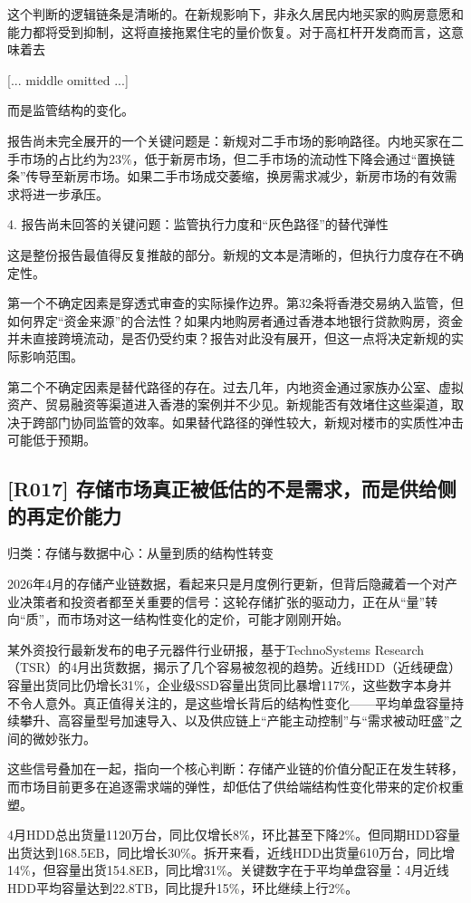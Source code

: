 \documentclass[11pt]{ctexart}
\begin{document}
这个判断的逻辑链条是清晰的。在新规影响下，非永久居民内地买家的购房意愿和能力都将受到抑制，这将直接拖累住宅的量价恢复。对于高杠杆开发商而言，这意味着去

[... middle omitted ...]

而是监管结构的变化。

报告尚未完全展开的一个关键问题是：新规对二手市场的影响路径。内地买家在二手市场的占比约为23\%，低于新房市场，但二手市场的流动性下降会通过“置换链条”传导至新房市场。如果二手市场成交萎缩，换房需求减少，新房市场的有效需求将进一步承压。

4. 报告尚未回答的关键问题：监管执行力度和“灰色路径”的替代弹性

这是整份报告最值得反复推敲的部分。新规的文本是清晰的，但执行力度存在不确定性。

第一个不确定因素是穿透式审查的实际操作边界。第32条将香港交易纳入监管，但如何界定“资金来源”的合法性？如果内地购房者通过香港本地银行贷款购房，资金并未直接跨境流动，是否仍受约束？报告对此没有展开，但这一点将决定新规的实际影响范围。

第二个不确定因素是替代路径的存在。过去几年，内地资金通过家族办公室、虚拟资产、贸易融资等渠道进入香港的案例并不少见。新规能否有效堵住这些渠道，取决于跨部门协同监管的效率。如果替代路径的弹性较大，新规对楼市的实质性冲击可能低于预期。

\subsection{[R017] 存储市场真正被低估的不是需求，而是供给侧的再定价能力}
{\small\color{refgray}归类：存储与数据中心：从量到质的结构性转变}

2026年4月的存储产业链数据，看起来只是月度例行更新，但背后隐藏着一个对产业决策者和投资者都至关重要的信号：这轮存储扩张的驱动力，正在从“量”转向“质”，而市场对这一结构性变化的定价，可能才刚刚开始。

某外资投行最新发布的电子元器件行业研报，基于TechnoSystems Research（TSR）的4月出货数据，揭示了几个容易被忽视的趋势。近线HDD（近线硬盘）容量出货同比仍增长31\%，企业级SSD容量出货同比暴增117\%，这些数字本身并不令人意外。真正值得关注的，是这些增长背后的结构性变化——平均单盘容量持续攀升、高容量型号加速导入、以及供应链上“产能主动控制”与“需求被动旺盛”之间的微妙张力。

这些信号叠加在一起，指向一个核心判断：存储产业链的价值分配正在发生转移，而市场目前更多在追逐需求端的弹性，却低估了供给端结构性变化带来的定价权重塑。

4月HDD总出货量1120万台，同比仅增长8\%，环比甚至下降2\%。但同期HDD容量出货达到168.5EB，同比增长30\%。拆开来看，近线HDD出货量610万台，同比增14\%，但容量出货154.8EB，同比增31\%。关键数字在于平均单盘容量：4月近线HDD平均容量达到22.8TB，同比提升15\%，环比继续上行2\%。
\end{document}
